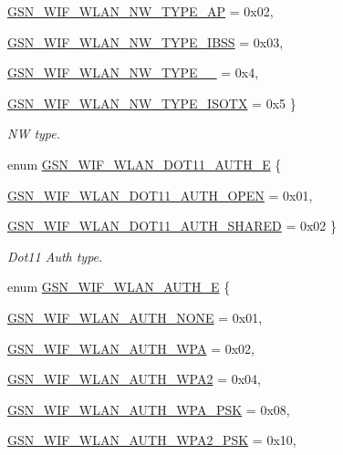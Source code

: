 \begin{DoxyCompactItemize}
\hyperlink{a00640_gga4d89b2a0c901a8c766f195897f16623fa6005fc49b47b857a5d371c912c1bf3fd}{GSN\_\-WIF\_\-WLAN\_\-NW\_\-TYPE\_\-AP} =  0x02, 
\par
\hyperlink{a00640_gga4d89b2a0c901a8c766f195897f16623faf57bc7deeac6ae399614faf0b9d20fba}{GSN\_\-WIF\_\-WLAN\_\-NW\_\-TYPE\_\-IBSS} =  0x03, 
\par
\hyperlink{a00640_gga4d89b2a0c901a8c766f195897f16623faa63e066458c172dea3b093f1bed382c6}{GSN\_\-WIF\_\-WLAN\_\-NW\_\-TYPE\_\_} =  0x4, 
\par
\hyperlink{a00640_gga4d89b2a0c901a8c766f195897f16623fa4d99b481ead0aaa86d901a99899befef}{GSN\_\-WIF\_\-WLAN\_\-NW\_\-TYPE\_\-ISOTX} =  0x5
 \}
\begin{DoxyCompactList}\small\item\em NW type. \end{DoxyCompactList}\item 
enum \hyperlink{a00677_ga5415d31a2d60b731af07dc04240e540c}{GSN\_\-WIF\_\-WLAN\_\-DOT11\_\-AUTH\_\-E} \{ \par
\hyperlink{a00640_gga5415d31a2d60b731af07dc04240e540cad9009c323b9b80ec4a57c22a6a42bf20}{GSN\_\-WIF\_\-WLAN\_\-DOT11\_\-AUTH\_\-OPEN} =  0x01, 
\par
\hyperlink{a00640_gga5415d31a2d60b731af07dc04240e540cafc5f6649938bc4669e367f043b84fdac}{GSN\_\-WIF\_\-WLAN\_\-DOT11\_\-AUTH\_\-SHARED} =  0x02
 \}
\begin{DoxyCompactList}\small\item\em Dot11 Auth type. \end{DoxyCompactList}\item 
enum \hyperlink{a00677_ga2b3917a91d576d0d037c406e6397cab9}{GSN\_\-WIF\_\-WLAN\_\-AUTH\_\-E} \{ \par
\hyperlink{a00640_gga2b3917a91d576d0d037c406e6397cab9abe5ad72eaf443c01179b9fdd3e44ad94}{GSN\_\-WIF\_\-WLAN\_\-AUTH\_\-NONE} =  0x01, 
\par
\hyperlink{a00640_gga2b3917a91d576d0d037c406e6397cab9a9b0bab6a04025a0c9a9094fcd005b288}{GSN\_\-WIF\_\-WLAN\_\-AUTH\_\-WPA} =  0x02, 
\par
\hyperlink{a00640_gga2b3917a91d576d0d037c406e6397cab9aa801aac72ada7e073ef56477001cd2fe}{GSN\_\-WIF\_\-WLAN\_\-AUTH\_\-WPA2} =  0x04, 
\par
\hyperlink{a00640_gga2b3917a91d576d0d037c406e6397cab9a2df301dcc2ba2da66f8e1bc2a70002c0}{GSN\_\-WIF\_\-WLAN\_\-AUTH\_\-WPA\_\-PSK} =  0x08, 
\par
\hyperlink{a00640_gga2b3917a91d576d0d037c406e6397cab9aadfb9e64b7645e372f4d109180b44fca}{GSN\_\-WIF\_\-WLAN\_\-AUTH\_\-WPA2\_\-PSK} =  0x10, 

\end{DoxyCompactItemize}
